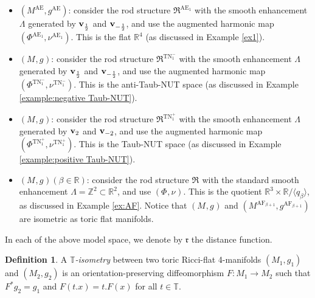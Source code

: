 \documentclass[a4paper,11pt]{amsart}
\theoremstyle{definition}
\newtheorem{definition}[theorem]{Definition}
\numberwithin{equation}{section}
\newcommand{\R}{\mathbb{R}}
\newcommand{\dT}{\mathbb{T}}
\newcommand{\dZ}{\mathbb{Z}}
\newcommand{\mR} {\mathfrak R}
\DeclareMathOperator{\bv}{{\bf v}}
\DeclareMathOperator{\Ae}{AE}
\DeclareMathOperator{\TN}{TN}
\DeclareMathOperator{\TNp}{TN^+}
\DeclareMathOperator{\TNm}{TN^{--}}
\DeclareMathOperator{\AF}{AF}
\DeclareMathOperator{\AFa}{AF_\beta}
\begin{document}
\begin{itemize}
    \item $(M^{\Ae}, g^{\Ae})$: consider the rod structure $\mR^{\Ae_1}$ with the smooth enhancement $\Lambda$ generated by $\bv_{\frac{1}{2}}$ and $\bv_{-\frac{1}{2}}$, and use the augmented harmonic map $(\Phi^{\Ae_1}, \nu^{\Ae_1})$. 
    This is the flat $\R^4$ (as discussed in Example \ref{ex1}). 
 \item $(M^{\TNm}, g^{\TNm})$: consider the rod structure $\mR^{\TN^{-}_1}$ with the  smooth enhancement $\Lambda$ generated by $\bv_{\frac{1}{2}}$ and $\bv_{-\frac{1}{2}}$, and use the augmented harmonic map $(\Phi^{\TN^{-}_{1}}, \nu^{\TN^{-}_1})$. This is the anti-Taub-NUT space  (as discussed in Example \ref{example:negative Taub-NUT}).  
 \item $(M^{\TNp}, g^{\TNp})$: consider the rod structure $\mR^{\TN^{+}_1}$ with the smooth enhancement $\Lambda$ generated by $\bv_{2}$ and $\bv_{-2}$, and use the augmented harmonic map $(\Phi^{\TN^{+}_{1}}, \nu^{\TN^{+}_1})$. This is the  Taub-NUT space  (as discussed in Example \ref{example:positive Taub-NUT}). 

\item $(M^{\AFa}, g^{\AFa})(\beta\in \R)$: consider the rod structure $\mR^{\AFa}$ with the standard smooth enhancement $\Lambda=\dZ^2\subset \R^2$, and use $(\Phi^{\AFa}, \nu^{\AFa})$. This is the quotient $\R^3\times \R/\langle q_\beta\rangle$, as discussed in Example \ref{ex:AF}. Notice that $(M^{\AFa}, g^{\AFa})$ and $(M^{\AF_{\beta+1}}, g^{\AF_{\beta+1}})$ are isometric as toric flat manifolds. 
\end{itemize}

In each of the above model space, we denote by $\mathfrak r$ the distance function. 

\begin{definition}
     A \emph{$\mathbb T$-isometry} between two toric Ricci-flat 4-manifolds $(M_1, g_1)$ and $(M_2, g_2)$ is an orientation-preserving diffeomorphism $F:M_1\rightarrow M_2$ such that  $F^*g_2=g_1$ and  $F(t.x)=t. F(x)$ for all $t\in \dT$.
\end{definition}
\end{document}
